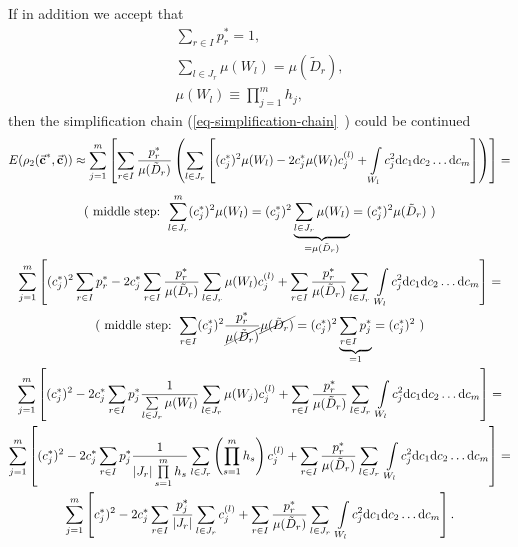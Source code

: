 If in addition we accept that
\begin{gather}
\sum\limits_{r \in I} p_{r}^{*} =1, \\
\sum\limits_{l \in J_{r}} \mu(W_{l}) =\mu(\tilde{D}_{r}), \\
\mu(W_{l}) \equiv \prod\limits_{j=1}^{m}h_{j},
\end{gather}
then the simplification chain (\vref{eq-simplification-chain}~) could be continued
\begin{gather}
\nonumber
E(\rho_{2}(\vec{\textbf{c}}^{*},\vec{\textbf{c}})) \approx \sum\limits_{j=1}^{m}  \left[ \sum\limits_{r \in I} \frac{p_{r}^{*}}{\mu(\tilde{D}_{r})} \left( \sum\limits_{l \in J_{r}} \left[ (c_{j}^{*})^{2} \mu(W_{l}) - 2c_{j}^{*} \mu(W_{l}) c_{j}^{(l)} + \int\limits_{W_{l}} c_{j}^{2} \mathrm{d}c_{1} \mathrm{d}c_{2} \dots \mathrm{d}c_{m} \right] \right) \right] = 
\end{gather}
\begin{gather}
\nonumber
\text{( middle step: } \sum_{l \in J_{r}}^{m}(c_{j}^{*})^{2} \mu(W_{l}) = (c_{j}^{*})^{2} \underbrace{\sum_{l \in J_{r}} \mu(W_{l})}_{=\mu(\tilde{D}_{r})} = (c_{j}^{*})^{2} \mu(\tilde{D}_{r}) \text{ )} \\
\nonumber
\sum\limits_{j=1}^{m} \left[  (c_{j}^{*})^{2}  \sum\limits_{r \in I} p_{r}^{*}  - 2c_{j}^{*}  \sum\limits_{r \in I} \frac{p_{r}^{*}}{\mu(\tilde{D}_{r})} \sum\limits_{l \in J_{r}} \mu(W_{l})  c_{j}^{(l)}  + \sum\limits_{r \in I} \frac{p_{r}^{*}}{\mu(\tilde{D}_{r})} \sum\limits_{l \in J_{r}} \ \int\limits_{W_{l}} c_{j}^{2}  \mathrm{d}c_{1} \mathrm{d}c_{2} \dots \mathrm{d}c_{m} \right] = \\
\nonumber
\text{( middle step: } \sum_{r \in I} (c_{j}^{*})^{2} \frac{p_{r}^{*}}{\cancel{\mu(\tilde{D}_{r})}} \cancel{\mu(\tilde{D}_{r})} = (c_{j}^{*})^{2} \underbrace{\sum_{r \in I} p_{j}^{*}}_{=1} = (c_{j}^{*})^{2} \text{ )}\\
\nonumber
\sum\limits_{j=1}^{m} \left[  (c_{j}^{*})^{2} - 2c_{j}^{*} \sum\limits_{r \in I} p_{j}^{*} \frac{1}{\sum\limits_{l \in J_{r}} \mu(W_{l})} \sum\limits_{l \in J_{r}} \mu(W_{j}) c_{j}^{(l)} +  \sum\limits_{r \in I} \frac{p_{r}^{*}}{\mu(\tilde{D}_{r})} \sum\limits_{l \in J_{r}} \ \int\limits_{W_{l}} c_{j}^{2}  \mathrm{d}c_{1} \mathrm{d}c_{2} \dots \mathrm{d}c_{m} \right] = \\
\nonumber
\sum\limits_{j=1}^{m}  \left[    (c_{j}^{*})^{2} - 2c_{j}^{*} \sum\limits_{r \in I} p_{j}^{*} \frac{1}{\left| J_{r} \right| \prod\limits_{s=1}^{m} h_{s}} \sum\limits_{l \in J_{r}} \left( \prod_{s=1}^{m} h_{s} \right) c_{j}^{(l)} +  \sum\limits_{r \in I} \frac{p_{r}^{*}}{\mu(\tilde{D}_{r})} \sum\limits_{l \in J_{r}} \ \int\limits_{W_{l}} c_{j}^{2}  \mathrm{d}c_{1} \mathrm{d}c_{2} \dots \mathrm{d}c_{m} \right] = \\
\sum\limits_{j=1}^{m} \left[ c_{j}^{*})^{2} - 2c_{j}^{*} \sum\limits_{r \in I} \frac{p_{j}^{*}}{ \left| J_{r} \right|} \sum\limits_{l \in J_{r}} c_{j}^{(l)} + \sum\limits_{r \in I} \frac{p_{r}^{*}}{\mu(\tilde{D}_{r})} \sum\limits_{l \in J_{r}} \ \int\limits_{W_{l}} c_{j}^{2}  \mathrm{d}c_{1} \mathrm{d}c_{2} \dots \mathrm{d}c_{m} \right]. \label{eq-final-simplification}
\end{gather}
